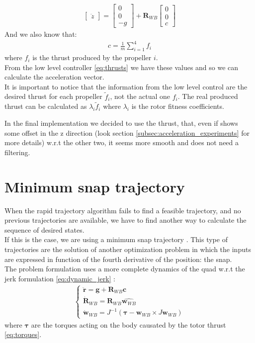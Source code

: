 \begin{itemize}
\begin{align}
{\begin{bmatrix}
\ddot{z}
\end{bmatrix}}=
{\begin{bmatrix}
0 \\[10pt]
0 \\[10pt]
-g
\end{bmatrix}} 
+ \boldsymbol{R}_{WB}
{\begin{bmatrix}
0 \\[10pt]
0 \\[10pt]
c
\end{bmatrix}}
\end{align}
And we also know that:
 \begin{align}
c = \frac{1}{m}\sum_{i=1}^{4}{f_i}
\end{align}
where $f_i$ is the thrust produced by the propeller $i$.\\
From the low level controller \ref{eq:thrusts} we have these values and so we can calculate the acceleration vector.\\
It is important to notice that the information from the low level control are the desired thrust for each propeller $\tilde{f}_i$, not the actual one $f_i$. The real produced thrust can be calculated as $\lambda_i\tilde{f}_i$ where $\lambda_i$ is the rotor fitness coefficients.\\
\end{itemize}


In the final implementation we decided to use the thrust, that, even if shows some offset in the z direction (look section \ref{subsec:acceleration_experiments} for more details) w.r.t the other two, it seems more smooth and does not need a filtering.


\section{Minimum snap trajectory}
When the rapid trajectory algorithm fails to find a feasible trajectory, and no previous trajectories are available, we have to find another way to calculate the sequence of desired states.\\
If this is the case, we are using a minimum snap trajectory \cite{mellinger2011minimum}. This type of trajectories are the solution of another optimization problem in which the inputs are expressed in function of the fourth derivative of the position: the snap.\\

The problem formulation uses a more complete dynamics of the quad w.r.t the jerk formulation \ref{eq:dynamic_jerk}
:
\begin{align}
\begin{cases}
\ddot{\boldsymbol{r}} = \boldsymbol{g} + \boldsymbol{R}_{WB}\boldsymbol{c}  \\[10pt]
\dot{\boldsymbol{R}}_{WB} = \boldsymbol{R}_{WB}\hat{\boldsymbol{w}_{WB}}  \\[10pt]
\dot{\boldsymbol{w}}_{WB} = J^{-1} (\boldsymbol{\tau} - \boldsymbol{w}_{WB} \times J\boldsymbol{w}_{WB})
\end{cases}
\end{align}
where $\boldsymbol{\tau}$ are the torques acting on the body causated by the totor thrust \ref{eq:torques}.\\

